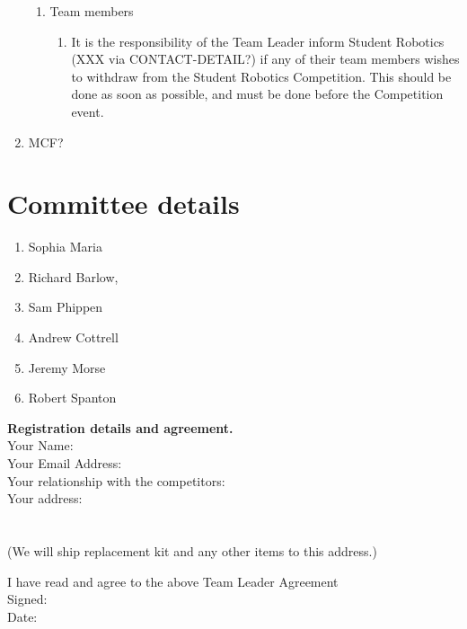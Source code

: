 \documentclass[a4paper, 11pt]{scrartcl}
\begin{document}
\begin{enumerate}
\begin{enumerate}
\item Team members
\begin{enumerate}
\item It is the responsibility of the Team Leader inform Student Robotics
(XXX via CONTACT-DETAIL?) if any of their team members wishes to withdraw
from the Student Robotics Competition. This should be done as soon as possible,
and must be done before the Competition event.
\end{enumerate}

\end{enumerate}

\item MCF?

\end{enumerate}

\appendix



\section{Committee details}

\begin{enumerate}
\item Sophia Maria
\item Richard Barlow,
\item Sam Phippen
\item Andrew Cottrell
\item Jeremy Morse
\item Robert Spanton
\end{enumerate}

\noindent
\textbf{Registration details and agreement.} \\
\doublespacing
\noindent
Your Name:\hrulefill\\
Your Email Address:\hrulefill\\
Your relationship with the competitors:\hrulefill\\
Your address:\hrulefill\\
\hbox{}\hrulefill\\
\hbox{}\hrulefill\\
(We will ship replacement kit and any other items to this address.)

\noindent
\dotfill\hfill

\noindent
I have read and agree to the above Team Leader Agreement\\
Signed:\hrulefill\\
Date:\hrulefill\\

\singlespacing
\end{document}
